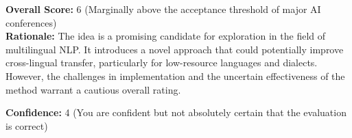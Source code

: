 \begin{tcolorbox}[colback=green!10!white, colframe=green!80!black, title=\textbf{Reviewer 2}]
\vspace{10pt}

\textbf{Overall Score:} 6 (Marginally above the acceptance threshold of major AI conferences)\\
\textbf{Rationale:} The idea is a promising candidate for exploration in the field of multilingual NLP. It introduces a novel approach that could potentially improve cross-lingual transfer, particularly for low-resource languages and dialects. However, the challenges in implementation and the uncertain effectiveness of the method warrant a cautious overall rating.

\vspace{10pt}

\textbf{Confidence:} 4 (You are confident but not absolutely certain that the evaluation is correct)
\end{tcolorbox}

\vspace{20pt}


